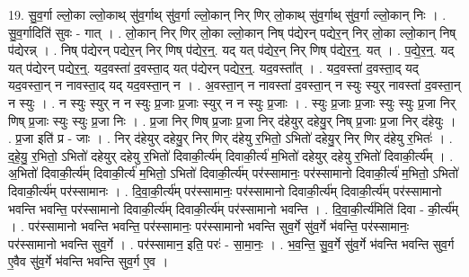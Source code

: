 \documentclass[17pt]{extarticle}
\begin{document}
19. सु॒व॒र्गा ल्लो॒का ल्लो॒काथ् सु॑व॒र्गाथ् सु॑व॒र्गा ल्लो॒कान् निर् णिर् लो॒काथ् सु॑व॒र्गाथ् सु॑व॒र्गा ल्लो॒कान् निः । . सु॒व॒र्गादिति॑ सुवः - गात् । . लो॒कान् निर् णिर् लो॒का ल्लो॒कान् निष् प॑द्येरन् पद्येर॒न् निर् लो॒का ल्लो॒कान् निष् प॑द्येरन्न् । . निष् प॑द्येरन् पद्येर॒न् निर् णिष् प॑द्येर॒न्॒. यद् यत् प॑द्येर॒न् निर् णिष् प॑द्येर॒न्॒. यत् । . प॒द्ये॒र॒न्॒. यद् यत् प॑द्येरन् पद्येर॒न्॒. यद॒वस्ता॑ द॒वस्ता॒द् यत् प॑द्येरन् पद्येर॒न्॒. यद॒वस्ता᳚त् । . यद॒वस्ता॑ द॒वस्ता॒द् यद् यद॒वस्ता॒न् न नावस्ता॒द् यद् यद॒वस्ता॒न् न । . अ॒वस्ता॒न् न नावस्ता॑ द॒वस्ता॒न् न स्युः स्युर् नावस्ता॑ द॒वस्ता॒न् न स्युः । . न स्युः स्युर् न न स्युः प्र॒जाः प्र॒जाः स्युर् न न स्युः प्र॒जाः । . स्युः प्र॒जाः प्र॒जाः स्युः स्युः प्र॒जा निर् णिष् प्र॒जाः स्युः स्युः प्र॒जा निः । . प्र॒जा निर् णिष् प्र॒जाः प्र॒जा निर् द॑हेयुर् दहेयु॒र् निष् प्र॒जाः प्र॒जा निर् द॑हेयुः । . प्र॒जा इति॑ प्र - जाः । . निर् द॑हेयुर् दहेयु॒र् निर् णिर् द॑हेयु र॒भितो॒ ऽभितो॑ दहेयु॒र् निर् णिर् द॑हेयु र॒भितः॑ । . द॒हे॒यु॒ र॒भितो॒ ऽभितो॑ दहेयुर् दहेयु र॒भितो॑ दिवाकी॒र्त्य॑म् दिवाकी॒र्त्य॑ म॒भितो॑ दहेयुर् दहेयु र॒भितो॑ दिवाकी॒र्त्य᳚म् । . अ॒भितो॑ दिवाकी॒र्त्य॑म् दिवाकी॒र्त्य॑ म॒भितो॒ ऽभितो॑ दिवाकी॒र्त्य॑म् पर॑स्सामानः॒ पर॑स्सामानो दिवाकी॒र्त्य॑ म॒भितो॒ ऽभितो॑ दिवाकी॒र्त्य॑म् पर॑स्सामानः । . दि॒वा॒की॒र्त्य॑म् पर॑स्सामानः॒ पर॑स्सामानो दिवाकी॒र्त्य॑म् दिवाकी॒र्त्य॑म् पर॑स्सामानो भवन्ति भवन्ति॒ पर॑स्सामानो दिवाकी॒र्त्य॑म् दिवाकी॒र्त्य॑म् पर॑स्सामानो भवन्ति । . दि॒वा॒की॒र्त्य॑मिति॑ दिवा - की॒र्त्य᳚म् । . पर॑स्सामानो भवन्ति भवन्ति॒ पर॑स्सामानः॒ पर॑स्सामानो भवन्ति सुव॒र्गे सु॑व॒र्गे भ॑वन्ति॒ पर॑स्सामानः॒ पर॑स्सामानो भवन्ति सुव॒र्गे । . पर॑स्सामान॒ इति॒ परः॑ - सा॒मा॒नः॒ । . भ॒व॒न्ति॒ सु॒व॒र्गे सु॑व॒र्गे भ॑वन्ति भवन्ति सुव॒र्ग ए॒वैव सु॑व॒र्गे भ॑वन्ति भवन्ति सुव॒र्ग ए॒व । \newline
\end{document}
